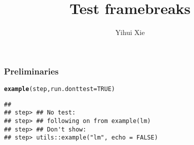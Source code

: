 \documentclass{beamer}\usepackage[]{graphicx}\usepackage[]{xcolor}
\title{Test framebreaks}
\author{Yihui Xie}
\newcommand{\hlnum}[1]{\textcolor[rgb]{0.686,0.059,0.569}{#1}}%
\newcommand{\hldef}[1]{\textcolor[rgb]{0.345,0.345,0.345}{#1}}%
\newcommand{\hlkwc}[1]{\textcolor[rgb]{0.333,0.667,0.333}{#1}}%
\newcommand{\hlkwd}[1]{\textcolor[rgb]{0.737,0.353,0.396}{\textbf{#1}}}%
\newenvironment{knitrout}{}{} %
\begin{document}
\maketitle


\begin{frame}
\frametitle{Preliminaries}
\begin{knitrout}\footnotesize
{}\color{fgcolor}
\begin{alltt}
\hlkwd{example}\hldef{(step,} \hlkwc{run.donttest} \hldef{=} \hlnum{TRUE}\hldef{)}
\end{alltt}
\begin{verbatim}
## 
## step> ## No test: 
## step> ## following on from example(lm)
## step> ## Don't show: 
## step> utils::example("lm", echo = FALSE)
\end{verbatim}


\end{knitrout}
\end{frame}
\end{document}
